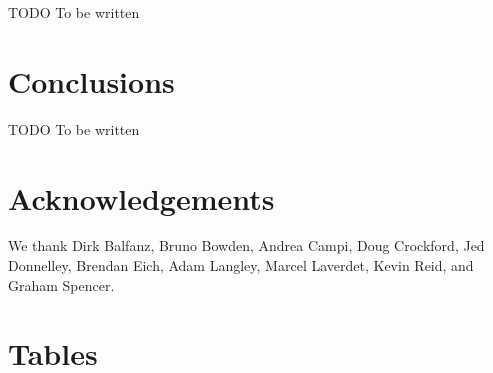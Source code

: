 \documentclass[letterpaper,twocolumn,10pt]{article}
\begin{document}
TODO To be written

\section{Conclusions}

TODO To be written

\section{Acknowledgements}

We thank 
Dirk Balfanz,
Bruno Bowden,
Andrea Campi,
Doug Crockford,
Jed Donnelley,
Brendan Eich,
Adam Langley,
Marcel Laverdet,
Kevin Reid,
and
Graham Spencer.

\appendix

\section{Tables}
\end{document}
